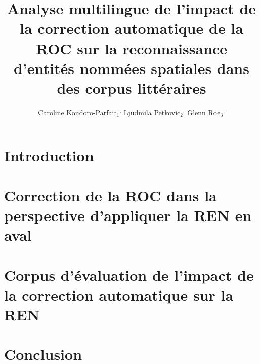 \documentclass[utf8x]{article-hermes_frenchb}
\title[Correction des contaminations de la ROC]{Analyse multilingue de l'impact de la correction automatique de la ROC sur la reconnaissance d’entités nommées spatiales dans des corpus littéraires}
\author{Caroline Koudoro-Parfait$_1$\fup{*}$^,$\fup{**} \andauthor Ljudmila Petkovic$_2$\fup{*}$^,$\fup{**} \andauthor Glenn Roe$_3$\fup{*}$^,$\fup{**}  }
\begin{document}
\maketitlepage

\newcommand{\fakesentence}{Attention à ce que les figures et les tableaux ne débordent pas dans les marges. }
\newcommand{\fakeparagraph}{
\fakesentence
\fakesentence
\fakesentence
\fakesentence
\fakesentence
\fakesentence
}

\newcommand{\TAL}{traitement automatique des langues}

\newcommand{\CAD}{c'est-à-dire}
\newcommand{\COLL}{et collègues}
\newcommand{\PEX}{par exemple}
\newcommand{\POPP}{par opposition à}

\newcommand{\cad}{c.-à-d.}
\newcommand{\coll}{et~coll.}
\newcommand{\pex}{p.~ex.}
\newcommand{\popp}{p.~opp.}

\section{Introduction}


\section{Correction de la ROC dans la perspective d'appliquer la REN en aval}

\label{sec:sota}

\section{Corpus d'évaluation de l'impact de la correction automatique sur la REN}
\label{sec:data}


%






%
\vspace{-0.5cm}
\section{Conclusion}

\label{sec:concl}



\end{document}
